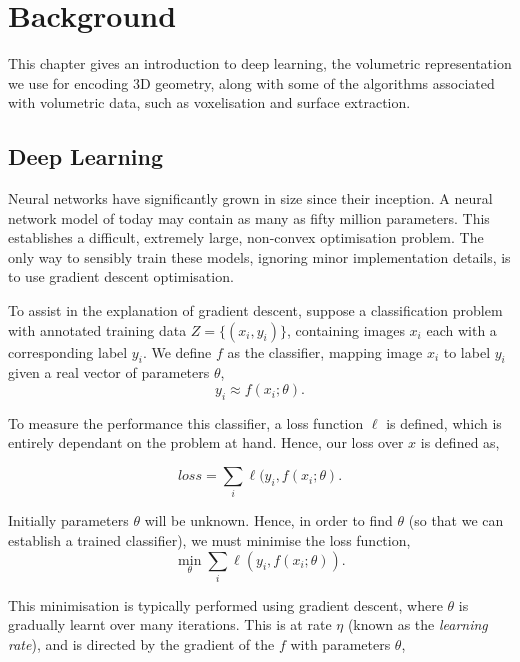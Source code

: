 \graphicspath{{chapter_background/}}
\chapter{Background}
\label{chapter:background}

This chapter gives an introduction to deep learning, the volumetric
representation we use for encoding 3D geometry, along with some of the
algorithms associated with volumetric data, such as voxelisation and
surface extraction.

\section{Deep Learning}
\label{sec:background:nn}


Neural networks have significantly grown in size since their
inception. A neural network model of today may contain as many as
fifty million parameters. This establishes a difficult, extremely
large, non-convex optimisation problem. The only way to sensibly train
these models, ignoring minor implementation details, is to use
gradient descent optimisation.


To assist in the explanation of gradient descent, suppose a
classification problem with annotated training data
$Z = \{(x_i, y_i)\}$, containing images $x_i$ each with a
corresponding label $y_i$. We define $f$ as the classifier, mapping
image $x_i$ to label $y_i$ given a real vector of parameters $\theta$,
\begin{equation}
  y_i \approx f(x_i;\theta) .
\end{equation}

\noindent To measure the performance this classifier, a loss function
$\ell$ is defined, which is entirely dependant on the problem at
hand. Hence, our loss over $x$ is defined as,

\begin{equation}
  loss = \sum_i \ell(y_i, f(x_i ; \theta) .
\end{equation}


\noindent Initially parameters $\theta$ will be unknown. Hence, in
order to find $\theta$ (so that we can establish a trained
classifier), we must minimise the loss function,
\begin{equation}
  \min_\theta \sum_i \ell(y_i, f(x_i ; \theta)) .
\end{equation}



\noindent This minimisation is typically performed using gradient
descent, where $\theta$ is gradually learnt over many iterations. This
is at rate $\eta$ (known as the \textit{learning rate}), and is
directed by the gradient of the $f$ with parameters $\theta$,

